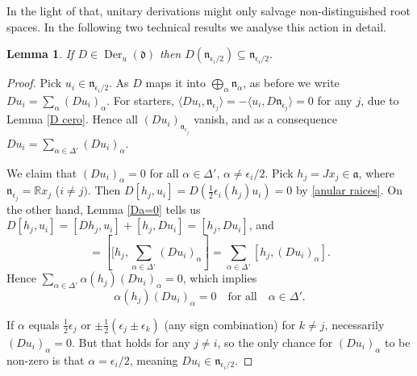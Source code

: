 \documentclass[12pt, twoside]{amsart}
\def\d{\mathfrak{d}}
\def\n{\mathfrak{n}}
\def\a{\mathfrak{a}}
\def\R{\mathbb{R}}
\newcommand{\op}[1]{\operatorname{#1}}
\newtheorem{lemma}[definition]{Lemma}
\theoremstyle{definition}
\begin{document}
\medskip
In the light of that, unitary derivations might only salvage non-distinguished root spaces. In the following two technical results we analyse this action in detail.

\begin{lemma} \label{D invariante}
If $D \in \op{Der}_{u}(\d)$ then   $D(\n_{\epsilon_i/2}) \subseteq \n_{\epsilon_i/2}$.
\end{lemma}

\begin{proof}
Pick $u_i \in \n_{\epsilon_i/2}$. As $D$ maps it into $\bigoplus_{\alpha} \n_\alpha$, as before we write $Du_i=\sum_{\alpha}(Du_i)_{\alpha}$. 
For starters, $\langle Du_i,  \n_{\epsilon_j}\rangle = - \langle u_i, D\n_{\epsilon_j} \rangle=0$ for any $j$, due to Lemma \ref{D cero}. Hence all  $(Du_i)_{\n_{\epsilon_j}}$ vanish, and as a consequence $Du_i=\sum_{\alpha \in \Delta'}(Du_i)_{\alpha}$. 
\par
\quad We claim that $(Du_i)_{\alpha}=0$ for all $\alpha\in \Delta'$, $\alpha \neq \epsilon_i/2$. Pick $h_j =Jx_j \in \a$, where $\n_{\epsilon_j}= \R x_j$ ($i \neq j)$. Then $D[h_j,u_i]=D\left (\tfrac{1}{2}\epsilon_i(h_j)u_i\right)=0$ by \eqref{anular raices}. On the other hand, Lemma \ref{Da=0} tells us 
$D[h_j,u_i]=[Dh_j,u_i]+[h_j,Du_i]=[h_j,Du_i]$, and 
\begin{equation*}
    [h_j,Du_i]=\left[[h_j, \sum_{\alpha \in \Delta'}(Du_i)_{\alpha}\right]=\sum_{\alpha \in \Delta'}[h_j,(Du_i)_{\alpha}].
\end{equation*}
Hence $ \sum_{\alpha \in \Delta'} \alpha(h_j)(Du_i)_{\alpha}=0$, 
which implies
\[ \alpha(h_j)(Du_i)_{\alpha}=0 \quad \text{for all} \quad \alpha \in \Delta'. \]

If $\alpha$ equals $\tfrac{1}{2} \epsilon_j$ or $\pm\tfrac{1}{2}(\epsilon_{j} \pm \epsilon_{k})$ (any sign combination) 
for $k\neq j$, necessarily $(Du_i)_{\alpha}=0$. But that holds for any $j \neq i$, so the only chance for $(Du_i)_{\alpha}$ to be non-zero is that $\alpha = \epsilon_i/2$, meaning $Du_i \in \n_{\epsilon_i/2}$.
\end{proof}
\end{document}
